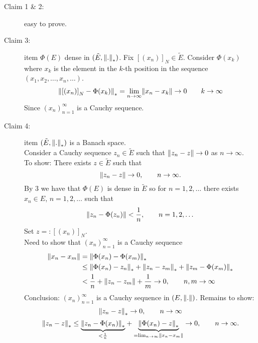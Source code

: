 \begin{description}
\item[Claim 1 \& 2:] easy to prove. 
\item[Claim 3:] item $\Phi(E)$ dense in $(\tilde E,\norm{.}_*)$. Fix $\left[ (x_n) \right]_N \in \tilde E$. Consider $\Phi(x_k)$ where $x_k$ is the element in the $k$-th position in the sequence $(x_1,x_2, \dots,x_n, \dots)$.
\begin{align*}
	\norm{\left[ (x_n) \right]_N - \Phi(x_k)}_* = \lim_{n \to \infty}\norm{x_n - x_k} \to 0 \qquad k \to \infty
\end{align*}
Since $(x_n)_{n=1}^{\infty}$ is a Cauchy sequence. \\
\item[Claim 4:] item $(\tilde E, \norm{.}_*)$ is a Banach space.\\
Consider a Cauchy sequence $z_n \in \tilde E$ such that $\norm{z_n - z} \to 0$ as $n \to \infty$. \\
To show: There exists $z \in \tilde E$ such that 
\[
	\norm{z_n - z} \to 0, \qquad n \to \infty.
\]
By 3 we have that $\Phi(E)$ is dense in $ \tilde E$ so for $n=1,2,\dots$ there exists $x_n \in E$, $n=1,2,\dots$ such that
\[
	\norm{z_n - \Phi(z_n)} < \frac{1}{n}, \qquad  n=1,2,\dots
\]
Set $z=: \left[ (x_n) \right]_N$. \\
Need to show that $(x_n)_{n=1}^{\infty}$ is a Cauchy sequence
\begin{align*}
	\norm{x_n - x_m} &= \norm{\Phi(x_n)-\Phi(x_m)}_* \\
	& \leq  \norm{\Phi(x_n)- z_n}_* + \norm{z_n-z_m}_* + \norm{z_m - \Phi(x_m)}_* \\
	&< \frac{1}{n} + \norm{z_n-z_m} + \frac{1}{m} \to 0, \qquad n,m \to \infty
\end{align*}
Conclusion: $(x_n)_{n=1}^{\infty}$ is a Cauchy sequence in $(E, \norm{.})$. Remains to show:
\[
	\norm{z_n-z}_* \to 0, \qquad n \to \infty
\]
\[
	\norm{z_n - z}_* \leq \underset{< \frac{1}{n}}{\underbrace{\norm{z_n - \Phi(x_n)}_*}} + \underset{= \lim_{n \to \infty}\norm{x_n-x_m}}{\underbrace{\norm{\Phi(x_n)-z}_*}} \to 0, \qquad n \to \infty.
\]
\end{description}

